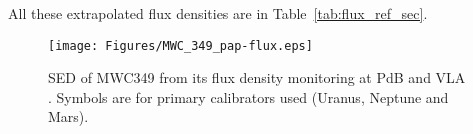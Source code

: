 All these extrapolated flux densities are in Table~\ref{tab:flux_ref_sec}.

\begin{figure}[h]
\begin{center}
  \texttt{[image: Figures/MWC\_349\_pap-flux.eps]}
  \caption{SED of MWC349 from its flux density monitoring at PdB and VLA \cite{krips}.
  Symbols are for primary calibrators used (Uranus, Neptune and Mars).}
\label{fig:Krips2017}
\end{center}
\end{figure}
